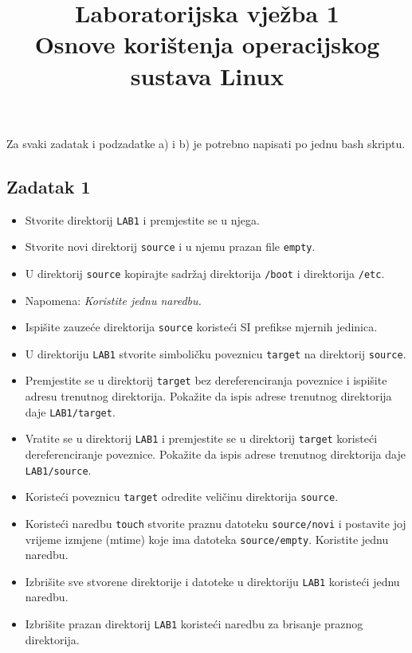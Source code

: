 \documentclass[12pt,a4paper]{article}
\newcommand{\shell}[1]{\texttt{#1}}
\begin{document}
	\title{Laboratorijska vježba 1\\{\small Osnove korištenja operacijskog sustava Linux}\vspace{-2em}}
	\maketitle
	\noindent Za svaki zadatak i podzadatke a) i b) je potrebno napisati po jednu bash skriptu.
	\subsection*{Zadatak 1}
	\begin{itemize}
		\item Stvorite direktorij \shell{LAB1} i premjestite se u njega.
		\item Stvorite novi direktorij \shell{source} i u njemu prazan file \shell{empty}.
		\item U direktorij \shell{source} kopirajte sadržaj direktorija \shell{/boot} i direktorija \shell{/etc}.
		\item[] Napomena: \textit{Koristite jednu naredbu.}
		\item Ispišite zauzeće direktorija \shell{source} koristeći SI prefikse mjernih jedinica.
		\item U direktoriju \shell{LAB1} stvorite simboličku poveznicu \shell{target} na direktorij \shell{source}.
		\item Premjestite se u direktorij \shell{target} bez dereferenciranja poveznice i ispišite adresu trenutnog direktorija. Pokažite da ispis adrese trenutnog direktorija daje \shell{LAB1/target}.
		\item Vratite se u direktorij \shell{LAB1} i premjestite se u direktorij \shell{target} koristeći dereferenciranje poveznice. Pokažite da ispis adrese trenutnog direktorija daje \shell{LAB1/source}.
		\item Koristeći poveznicu \shell{target} odredite veličinu direktorija \shell{source}.
		\item Koristeći naredbu \shell{touch} stvorite praznu datoteku \shell{source/novi} i postavite joj vrijeme izmjene (mtime) koje ima datoteka \shell{source/empty}. Koristite jednu naredbu.
		\item Izbrišite sve stvorene direktorije i datoteke u direktoriju \shell{LAB1} koristeći jednu naredbu.
		\item Izbrišite prazan direktorij \shell{LAB1} koristeći naredbu za brisanje praznog direktorija.
	\end{itemize} 
\end{document}
